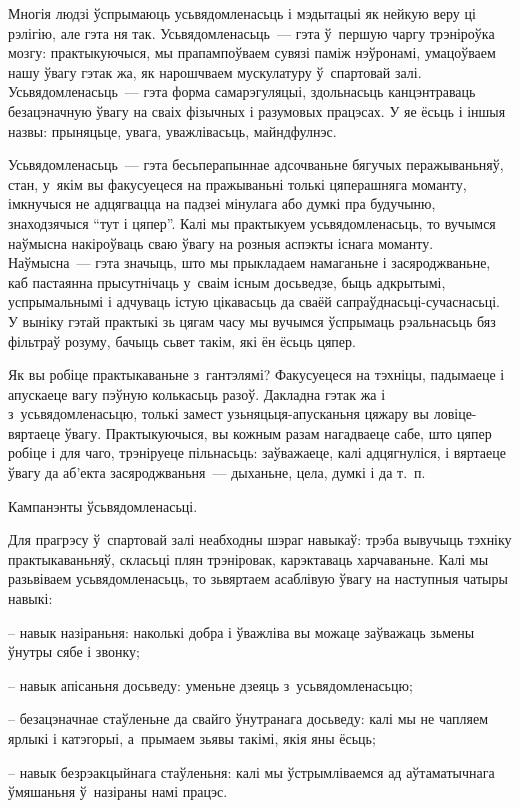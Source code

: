 Многія людзі ўспрымаюць усьвядомленасьць і мэдытацыі як нейкую веру ці рэлігію, але гэта ня так. Усьвядомленасьць~--- гэта ў~першую чаргу трэніроўка мозгу: практыкуючыся, мы прапампоўваем сувязі паміж нэўронамі, умацоўваем нашу ўвагу гэтак жа, як нарошчваем мускулатуру ў~спартовай залі. Усьвядомленасьць~--- гэта форма самарэгуляцыі, здольнасьць канцэнтраваць безацэначную ўвагу на сваіх фізычных і разумовых працэсах. У яе ёсьць і іншыя назвы: прыняцьце, увага, уважлівасьць, майндфулнэс.

Усьвядомленасьць~--- гэта бесьперапыннае адсочваньне бягучых перажываньняў, стан, у~якім вы факусуецеся на пражываньні толькі цяперашняга моманту, імкнучыся не адцягвацца на падзеі мінулага або думкі пра будучыню, знаходзячыся ``тут і цяпер''. Калі мы практыкуем усьвядомленасьць, то вучымся наўмысна накіроўваць сваю ўвагу на розныя аспэкты існага моманту. Наўмысна~--- гэта значыць, што мы прыкладаем намаганьне і засяроджваньне, каб пастаянна прысутнічаць у~сваім існым досьведзе, быць адкрытымі, успрымальнымі і адчуваць істую цікавасьць да сваёй сапраўднасьці-сучаснасьці. У выніку гэтай практыкі зь цягам часу мы вучымся ўспрымаць рэальнасьць бяз фільтраў розуму, бачыць сьвет такім, які ён ёсьць цяпер.

Як вы робіце практыкаваньне з~гантэлямі? Факусуецеся на тэхніцы, падымаеце і апускаеце вагу пэўную колькасьць разоў. Дакладна гэтак жа і з~усьвядомленасьцю, толькі замест узьняцьця-апусканьня цяжару вы ловіце-вяртаеце ўвагу. Практыкуючыся, вы кожным разам нагадваеце сабе, што цяпер робіце і для чаго, трэніруеце пільнасьць: заўважаеце, калі адцягнуліся, і вяртаеце ўвагу да аб'екта засяроджваньня~--- дыханьне, цела, думкі і да т.~п.

Кампанэнты ўсьвядомленасьці.

Для прагрэсу ў~спартовай залі неабходны шэраг навыкаў: трэба вывучыць тэхніку практыкаваньняў, скласьці плян трэніровак, карэктаваць харчаваньне. Калі мы разьвіваем усьвядомленасьць, то зьвяртаем асаблівую ўвагу на наступныя чатыры навыкі: 

– навык назіраньня: наколькі добра і ўважліва вы можаце заўважаць зьмены ўнутры сябе і звонку;

– навык апісаньня досьведу: уменьне дзеяць з~усьвядомленасьцю;

– безацэначнае стаўленьне да свайго ўнутранага досьведу: калі мы не чапляем ярлыкі і катэгорыі, а~прымаем зьявы такімі, якія яны ёсьць;

– навык безрэакцыйнага стаўленьня: калі мы ўстрымліваемся ад аўтаматычнага ўмяшаньня ў~назіраны намі працэс.

